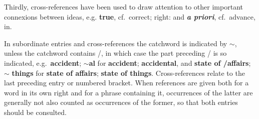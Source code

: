 Thirdly, cross-references have been used to draw attention to other important connexions between ideas, e.g. \textbf{true}, cf.\ correct; right: and \textbf{\textit{a priori}}, cf.\ advance, in.

In subordinate entries and cross-references the catchword is indicated by $\sim$, unless the catchword contains /, in which case the part preceding / is so indicated, e.g.\ \textbf{accident}; $\sim$\textbf{al} for \textbf{accident}; \textbf{accidental}, and \textbf{state of /affairs}; $\sim$ \textbf{things} for \textbf{state of affairs}; \textbf{state of things}. Cross-references relate to the last preceding entry or numbered bracket. When references are given both for a word in its own right and for a phrase containing it, occurrences of the latter are generally not also counted as occurrences of the former, so that both entries should be consulted.

